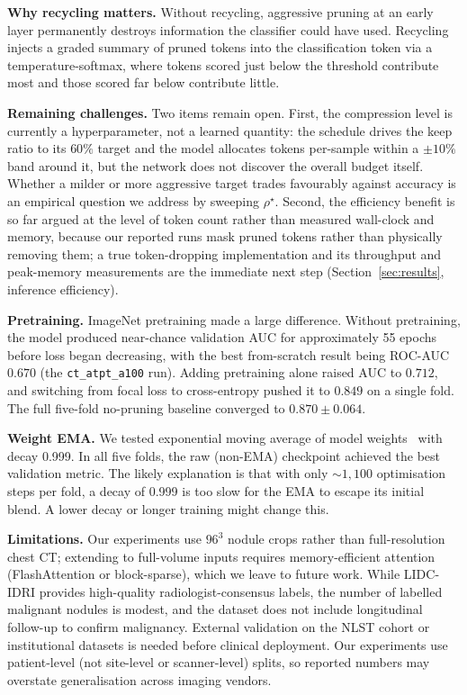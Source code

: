 \documentclass[journal]{IEEEtran}
\begin{document}
\textbf{Why recycling matters.} Without recycling, aggressive pruning at an
early layer permanently destroys information the classifier could have used.
Recycling injects a graded summary of pruned tokens into the classification
token via a temperature-softmax, where tokens scored just below the threshold
contribute most and those scored far below contribute little.

\textbf{Remaining challenges.} Two items remain open. First, the compression
level is currently a hyperparameter, not a learned quantity: the schedule
drives the keep ratio to its $60\%$ target and the model allocates tokens
per-sample within a $\pm 10\%$ band around it, but the network does not
discover the overall budget itself. Whether a milder or more aggressive
target trades favourably against accuracy is an empirical question we address
by sweeping $\rho^\star$. Second, the efficiency benefit is so far argued at
the level of token count rather than measured wall-clock and memory, because
our reported runs mask pruned tokens rather than physically removing them; a
true token-dropping implementation and its throughput and peak-memory
measurements are the immediate next step (Section~\ref{sec:results},
inference efficiency).

\textbf{Pretraining.} ImageNet pretraining made a large difference. Without
pretraining, the model produced near-chance validation AUC for approximately
55 epochs before loss began decreasing, with the best from-scratch result
being ROC-AUC $0.670$ (the \texttt{ct\_atpt\_a100} run). Adding pretraining
alone raised AUC to $0.712$, and switching from focal loss to cross-entropy
pushed it to $0.849$ on a single fold. The full five-fold no-pruning
baseline converged to $0.870 \pm 0.064$.

\textbf{Weight EMA.} We tested exponential moving average of model
weights~\cite{szegedy2016} with decay 0.999. In all five folds, the raw
(non-EMA) checkpoint achieved the best validation metric. The likely
explanation is that with only ${\sim}1{,}100$ optimisation steps per fold, a
decay of 0.999 is too slow for the EMA to escape its initial blend. A lower
decay or longer training might change this.

\textbf{Limitations.} Our experiments use $96^3$ nodule crops rather than
full-resolution chest CT; extending to full-volume inputs requires
memory-efficient attention (FlashAttention or block-sparse), which we leave
to future work. While LIDC-IDRI provides high-quality radiologist-consensus
labels, the number of labelled malignant nodules is modest, and the dataset
does not include longitudinal follow-up to confirm malignancy. External
validation on the NLST cohort or institutional datasets is needed before
clinical deployment. Our experiments use patient-level (not site-level or
scanner-level) splits, so reported numbers may overstate generalisation
across imaging vendors.
\end{document}
